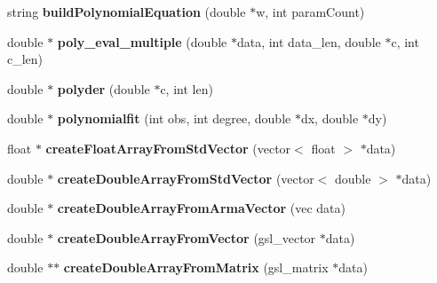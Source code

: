 \begin{DoxyCompactItemize}
\item 
\hypertarget{namespacekukadu_a8570101c8c4f0eb2512652952afd93c2}{string {\bfseries build\-Polynomial\-Equation} (double $\ast$w, int param\-Count)}\label{namespacekukadu_a8570101c8c4f0eb2512652952afd93c2}

\item 
\hypertarget{namespacekukadu_aae0e37983e2b1493297e7a040daf9345}{double $\ast$ {\bfseries poly\-\_\-eval\-\_\-multiple} (double $\ast$data, int data\-\_\-len, double $\ast$c, int c\-\_\-len)}\label{namespacekukadu_aae0e37983e2b1493297e7a040daf9345}

\item 
\hypertarget{namespacekukadu_acfe00d72c77824b38682dc8172405fc0}{double $\ast$ {\bfseries polyder} (double $\ast$c, int len)}\label{namespacekukadu_acfe00d72c77824b38682dc8172405fc0}

\item 
\hypertarget{namespacekukadu_ad112ecf6a165eb85f5573dfd8acb240e}{double $\ast$ {\bfseries polynomialfit} (int obs, int degree, double $\ast$dx, double $\ast$dy)}\label{namespacekukadu_ad112ecf6a165eb85f5573dfd8acb240e}

\item 
\hypertarget{namespacekukadu_ae9d541d44f8331748da2e6a5df11b5ff}{float $\ast$ {\bfseries create\-Float\-Array\-From\-Std\-Vector} (vector$<$ float $>$ $\ast$data)}\label{namespacekukadu_ae9d541d44f8331748da2e6a5df11b5ff}

\item 
\hypertarget{namespacekukadu_ab44f7624668bea31213745273cea7536}{double $\ast$ {\bfseries create\-Double\-Array\-From\-Std\-Vector} (vector$<$ double $>$ $\ast$data)}\label{namespacekukadu_ab44f7624668bea31213745273cea7536}

\item 
\hypertarget{namespacekukadu_a9fd78f70078a0656d2c7c93623cff1b4}{double $\ast$ {\bfseries create\-Double\-Array\-From\-Arma\-Vector} (vec data)}\label{namespacekukadu_a9fd78f70078a0656d2c7c93623cff1b4}

\item 
\hypertarget{namespacekukadu_a5fdba147bef04021392da0a56d126478}{double $\ast$ {\bfseries create\-Double\-Array\-From\-Vector} (gsl\-\_\-vector $\ast$data)}\label{namespacekukadu_a5fdba147bef04021392da0a56d126478}

\item 
\hypertarget{namespacekukadu_aa1357fb2a6908fa37f7640c5537677ae}{double $\ast$$\ast$ {\bfseries create\-Double\-Array\-From\-Matrix} (gsl\-\_\-matrix $\ast$data)}\label{namespacekukadu_aa1357fb2a6908fa37f7640c5537677ae}


\end{DoxyCompactItemize}
